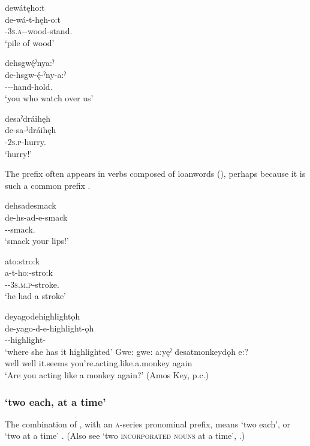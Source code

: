 \ex dewátęho:t\\
\gll de-wá-t-hęh-o:t\\
{\dualic}-\textsc{3s.a}-{\semireflexive}-wood-stand.{\stative}\\
\glt `pile of wood'

\ex dehsgwę́ˀnya:ˀ\\
\gll de-hsgw-ę́-ˀny-a:ˀ\\
{\dualic}--{\semireflexive}-hand-hold.{\stative}\\
\glt `you who watch over us'

\ex desaˀdráihęh\\
\gll de-sa-ˀdráihęh\\
{\dualic}-\textsc{2s.p}-hurry.{\noaspect}\\
\glt `hurry!'
\z
\z

The  {\dualic} prefix often appears in verbs composed of loanwords (), perhaps because it is such a common prefix .


\ea\label{ex:detwoex5}

\ea dehsadesmack\\
\gll de-hs-ad-e-smack\\
{\dualic}--smack.{\zeropunctual}\\
\glt `smack your lips!'

\ex ato:stro:k\\
\gll a-t-ho:-stro:k\\
{\factual}-{\dualic}-\textsc{3s.m.p}-stroke.{\zeropunctual}\\
\glt `he had a stroke'

\ex deyagodehighlightǫh\\
\gll de-yago-d-e-highlight-ǫh\\
{\dualic}--highlight-{\stative}\\
\glt `where she has it highlighted'
\ex
\gll Gwe:  gwe:  a:yęˀ  desatmonkeydǫh e:?\\
well well it.seems you’re.acting.like.a.monkey again\\
\glt ‘Are you acting like a monkey again?’ (Amos Key, p.c.)
\z
\z


\subsubsection*{ ‘two each, at a time’} \label{[de-A-incorporated noun-yahshe-sǫˀ]}
The combination of , with an \textsc{a}-series pronominal prefix, means ‘two each’, or ‘two at a time’ . (Also see  ‘two \textsc{incorporated nouns} at a time’, .)

